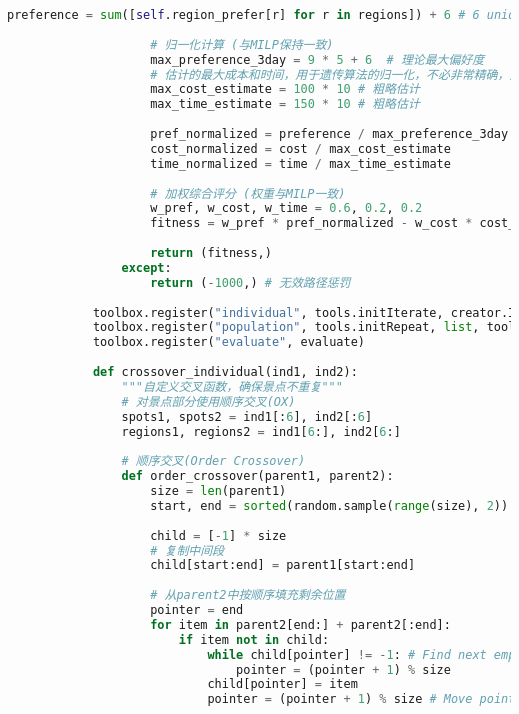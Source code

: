\begin{lstlisting}[language=Python]
                    preference = sum([self.region_prefer[r] for r in regions]) + 6 # 6 unique spots contribute to base preference
                    
                    # 归一化计算 (与MILP保持一致)
                    max_preference_3day = 9 * 5 + 6  # 理论最大偏好度
                    # 估计的最大成本和时间，用于遗传算法的归一化，不必非常精确，只要能大致区分好坏
                    max_cost_estimate = 100 * 10 # 粗略估计
                    max_time_estimate = 150 * 10 # 粗略估计
                    
                    pref_normalized = preference / max_preference_3day
                    cost_normalized = cost / max_cost_estimate
                    time_normalized = time / max_time_estimate
                    
                    # 加权综合评分 (权重与MILP一致)
                    w_pref, w_cost, w_time = 0.6, 0.2, 0.2
                    fitness = w_pref * pref_normalized - w_cost * cost_normalized - w_time * time_normalized
                    
                    return (fitness,)
                except:
                    return (-1000,) # 无效路径惩罚
            
            toolbox.register("individual", tools.initIterate, creator.Individual, create_individual)
            toolbox.register("population", tools.initRepeat, list, toolbox.individual)
            toolbox.register("evaluate", evaluate)
            
            def crossover_individual(ind1, ind2):
                """自定义交叉函数，确保景点不重复"""
                # 对景点部分使用顺序交叉(OX)
                spots1, spots2 = ind1[:6], ind2[:6]
                regions1, regions2 = ind1[6:], ind2[6:]
                
                # 顺序交叉(Order Crossover)
                def order_crossover(parent1, parent2):
                    size = len(parent1)
                    start, end = sorted(random.sample(range(size), 2))
                    
                    child = [-1] * size
                    # 复制中间段
                    child[start:end] = parent1[start:end]
                    
                    # 从parent2中按顺序填充剩余位置
                    pointer = end
                    for item in parent2[end:] + parent2[:end]:
                        if item not in child:
                            while child[pointer] != -1: # Find next empty spot
                                pointer = (pointer + 1) % size
                            child[pointer] = item
                            pointer = (pointer + 1) % size # Move pointer for next item
                    

\end{lstlisting}

